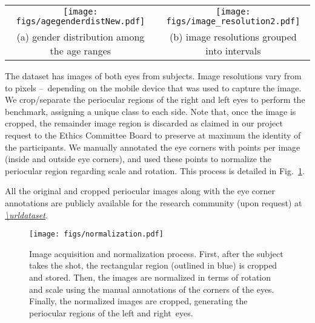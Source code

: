 \documentclass[journal]{IEEEtran}
\begin{document}
\begin{figure*}[!tb]
\centering
\begin{tabular}{cc}

    {\texttt{[image: figs/agegenderdistNew.pdf]}}&
    {\texttt{[image: figs/image\_resolution2.pdf]}\vspace{-0.75mm}} \\

    \footnotesize (a) gender distribution among the age ranges & \footnotesize (b) image resolutions grouped into  intervals
    \normalsize

\end{tabular}

\caption{Age, gender and image resolution distributions in the UFPR-Periocular dataset. (a) note that gender has a balanced distribution, but the age range is concentrated under 30 years old (64\% of the subjects). (b) more than \% of the images have a resolution between  and  pixels, and more than \% of the images have resolution higher than  pixels.}
\label{fig:stats}
\end{figure*}


The dataset has  images of both eyes from  subjects.
Image resolutions vary from  to  pixels --~depending on the mobile device that was used to capture the image.
We crop/separate the periocular regions of the right and left eyes to perform the benchmark, assigning a unique class to each side.
Note that, once the image is cropped, the remainder image region is discarded as claimed in our project request to the Ethics Committee Board to preserve at maximum the identity of the participants.
We manually annotated the eye corners with  points per image (inside and outside eye corners), and used these points to normalize the periocular region regarding scale and rotation.
This process is detailed in Fig.~\ref{fig:picprocess}.

All the original and cropped periocular images along with the eye corner annotations are publicly available for the research community (upon request) at \textit{\url{\urldataset}}.

\begin{figure}[!ht]
\centering

   	\texttt{[image: figs/normalization.pdf]}

\vspace{-1.5mm}

\caption{Image acquisition and normalization process.
First, after the subject takes the shot, the rectangular region (outlined in blue) is cropped and stored. 
Then, the images are normalized in terms of rotation and scale using the manual annotations of the corners of the eyes.
Finally, the normalized images are cropped, generating the periocular regions of the left and right~eyes.}
\label{fig:picprocess}
\end{figure}
\end{document}
